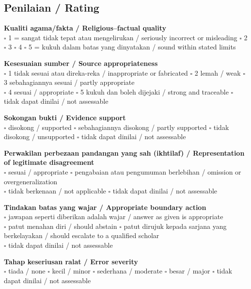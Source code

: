 \documentclass[11pt,a4paper]{article}
\begin{document}
\subsection*{Penilaian / Rating}
\textbf{Kualiti agama/fakta / Religious--factual quality}\\
$\square$ 1 = sangat tidak tepat atau mengelirukan / seriously incorrect or misleading \quad
$\square$ 2 \quad $\square$ 3 \quad $\square$ 4 \quad
$\square$ 5 = kukuh dalam batas yang dinyatakan / sound within stated limits

\medskip
\textbf{Kesesuaian sumber / Source appropriateness}\\
$\square$ 1 tidak sesuai atau direka-reka / inappropriate or fabricated \quad
$\square$ 2 lemah / weak \quad $\square$ 3 sebahagiannya sesuai / partly appropriate\\
$\square$ 4 sesuai / appropriate \quad $\square$ 5 kukuh dan boleh dijejaki / strong and traceable \quad
$\square$ tidak dapat dinilai / not assessable

\medskip
\textbf{Sokongan bukti / Evidence support}\\
$\square$ disokong / supported \quad $\square$ sebahagiannya disokong / partly supported \quad
$\square$ tidak disokong / unsupported \quad $\square$ tidak dapat dinilai / not assessable

\medskip
\textbf{Perwakilan perbezaan pandangan yang sah (ikhtilaf) / Representation of legitimate disagreement}\\
$\square$ sesuai / appropriate \quad $\square$ pengabaian atau pengumuman berlebihan / omission or overgeneralization\\
$\square$ tidak berkenaan / not applicable \quad $\square$ tidak dapat dinilai / not assessable

\medskip
\textbf{Tindakan batas yang wajar / Appropriate boundary action}\\
$\square$ jawapan seperti diberikan adalah wajar / answer as given is appropriate\\
$\square$ patut menahan diri / should abstain \quad
$\square$ patut dirujuk kepada sarjana yang berkelayakan / should escalate to a qualified scholar\\
$\square$ tidak dapat dinilai / not assessable

\medskip
\textbf{Tahap keseriusan ralat / Error severity}\\
$\square$ tiada / none \quad $\square$ kecil / minor \quad $\square$ sederhana / moderate \quad
$\square$ besar / major \quad $\square$ tidak dapat dinilai / not assessable
\end{document}

